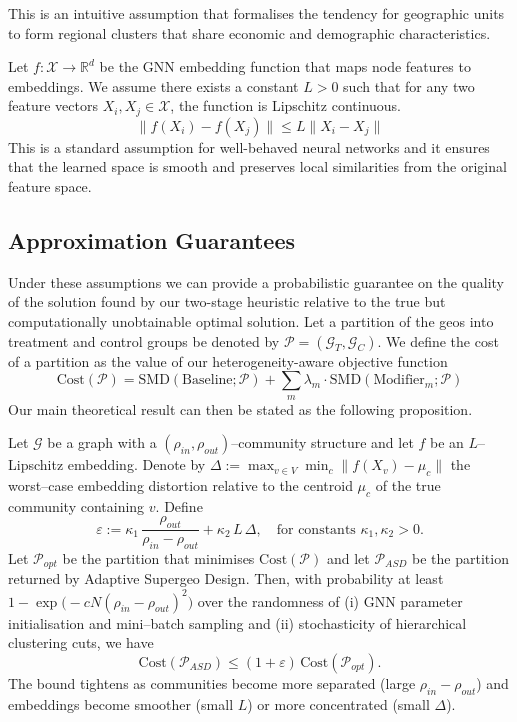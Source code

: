 \documentclass[final,3p,fleqn, 10pt]{elsarticle}
\begin{document}
    This is an intuitive assumption that formalises the tendency for geographic units to form regional clusters that share economic and demographic characteristics.

    \begin{assumption}
    Let $f: \mathcal{X} \to \mathbb{R}^d$ be the GNN embedding function that maps node features to embeddings. We assume there exists a constant $L > 0$ such that for any two feature vectors $X_i, X_j \in \mathcal{X}$, the function is Lipschitz continuous.
    $$ \|f(X_i) - f(X_j)\| \le L \|X_i - X_j\| $$
    This is a standard assumption for well-behaved neural networks and it ensures that the learned space is smooth and preserves local similarities from the original feature space.
    \end{assumption}

    \subsection{Approximation Guarantees}
    Under these assumptions we can provide a probabilistic guarantee on the quality of the solution found by our two-stage heuristic relative to the true but computationally unobtainable optimal solution. Let a partition of the geos into treatment and control groups be denoted by $\mathcal{P} = (\mathcal{G}_T, \mathcal{G}_C)$. We define the cost of a partition as the value of our heterogeneity-aware objective function
    $$ \text{Cost}(\mathcal{P}) = \text{SMD}(\text{Baseline}; \mathcal{P}) + \sum_{m} \lambda_m \cdot \text{SMD}(\text{Modifier}_m; \mathcal{P}) $$
    Our main theoretical result can then be stated as the following proposition.

    \begin{proposition}\label{prop:approx}
    Let $\mathcal{G}$ be a graph with a $(\rho_{in},\rho_{out})$–community structure and let $f$ be an $L$–Lipschitz embedding. Denote by $\Delta:=\max_{v\in V}\min_{c} \|f(X_v)-\mu_{c}\|$ the worst–case embedding distortion relative to the centroid $\mu_{c}$ of the true community containing $v$. Define
    \[
        \varepsilon := \kappa_1\,\frac{\rho_{out}}{\rho_{in}-\rho_{out}} + \kappa_2\,L\,\Delta, \quad \text{for constants }\kappa_1,\kappa_2>0.
    \]
    Let $\mathcal{P}_{opt}$ be the partition that minimises $\text{Cost}(\mathcal{P})$ and let $\mathcal{P}_{ASD}$ be the partition returned by Adaptive Supergeo Design. Then, with probability at least $1-\exp\bigl(-cN(\rho_{in}-\rho_{out})^{2}\bigr)$ over the randomness of (i) GNN parameter initialisation and mini–batch sampling and (ii) stochasticity of hierarchical clustering cuts, we have
    $$
        \text{Cost}(\mathcal{P}_{ASD}) \le (1+\varepsilon)\,\text{Cost}(\mathcal{P}_{opt}).
    $$
    The bound tightens as communities become more separated (large $\rho_{in}-\rho_{out}$) and embeddings become smoother (small $L$) or more concentrated (small $\Delta$).
    \end{proposition}
\end{document}
